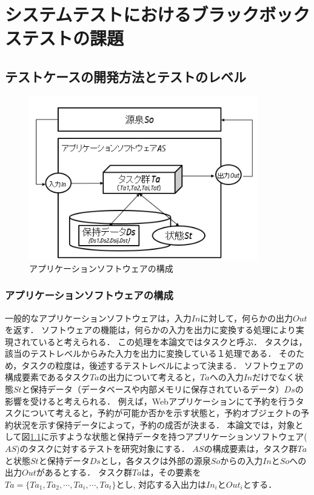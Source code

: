 \chapter{システムテストにおけるブラックボックステストの課題}
\section{テストケースの開発方法とテストのレベル}
\begin{figure}[htbp]
  \begin{center}
  \includegraphics[width=10cm]{./image/fig-1.png}
  \caption{アプリケーションソフトウェアの構成}
  \label{fig:fig-1}
  \end{center}
\end{figure}

\subsection{アプリケーションソフトウェアの構成}
一般的なアプリケーションソフトウェアは，入力$In$に対して，何らかの出力$Out$を返す．
ソフトウェアの機能は，何らかの入力を出力に変換する処理により実現されていると考えられる．
この処理を本論文ではタスクと呼ぶ．
タスクは，該当のテストレベルからみた入力を出力に変換している１処理である．
そのため，タスクの粒度は，後述するテストレベルによって決まる．
ソフトウェアの構成要素であるタスク$Ta$の出力について考えると，$Ta$への入力$In$だけでなく状態$St$と保持データ（データベースや内部メモリに保存されているデータ）$Ds$の影響を受けると考えられる．
例えば，Webアプリケーションにて予約を行うタスクについて考えると，予約が可能か否かを示す状態と，予約オブジェクトの予約状況を示す保持データによって，予約の成否が決まる．
本論文では，対象として図\ref{fig:fig-1}に示すような状態と保持データを持つアプリケーションソフトウェア($AS$)のタスクに対するテストを研究対象にする．
$AS$の構成要素は，タスク群$Ta$と状態$St$と保持データ$Ds$とし，各タスクは外部の源泉$So$からの入力$In$と$So$への出力$Out$があるとする．
タスク群$Ta$は，その要素を$Ta=\{Ta_1,Ta_2,\cdots,Ta_i,\cdots,Ta_t \}$とし, 対応する入出力は$In_i$と$Out_i$とする．

